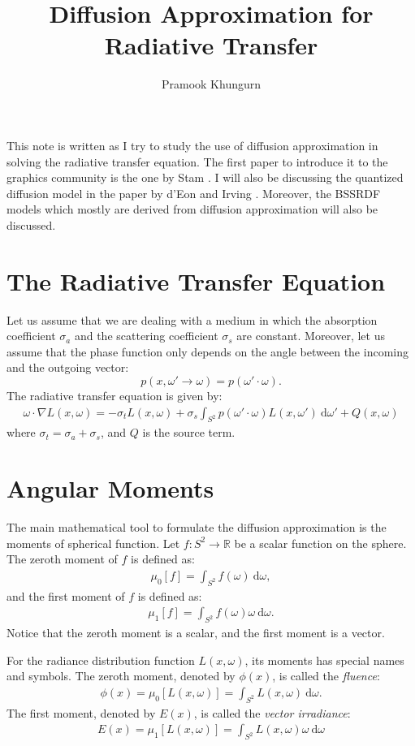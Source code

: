 \documentclass[10pt]{article}
\title{Diffusion Approximation for Radiative Transfer}
\author{Pramook Khungurn}
\newcommand{\dee}{\mathrm{d}}
\newcommand{\ra}{\rightarrow}
\newcommand{\Real}{\mathbb{R}}
\begin{document}
  \maketitle

  This note is written as I try to study the use of diffusion approximation in solving the radiative transfer equation.  The first paper to introduce it to the graphics community is the one by Stam \cite{Stam:1995}.  I will also be discussing the quantized diffusion model in the paper by d'Eon and Irving \cite{d'Eon:2011}.  Moreover, the BSSRDF models which mostly are derived from diffusion approximation \cite{Jensen:2001} will also be discussed.

  \section{The Radiative Transfer Equation}
  Let us assume that we are dealing with a medium in which the absorption coefficient $\sigma_a$ and the scattering coefficient $\sigma_s$ are constant.  Moreover, let us assume that the phase function only depends on the angle between the incoming and the outgoing vector: $$p(x, \omega' \ra \omega) = p(\omega' \cdot \omega).$$
  The radiative transfer equation is given by:
  \begin{align*}
  	\omega \cdot \nabla L(x,\omega) = -\sigma_t L(x,\omega) + \sigma_s \int_{S^2} p(\omega' \cdot \omega) L(x,\omega')\ \dee\omega' + Q(x,\omega)
  \end{align*}
  where $\sigma_t = \sigma_a + \sigma_s$, and $Q$ is the source term.

  \section{Angular Moments}

  The main mathematical tool to formulate the diffusion approximation is the moments of spherical function.  Let $f: S^2 \ra \Real$ be a scalar function on the sphere.  The zeroth moment of $f$ is defined as:
  \begin{align*}
  	\mu_0[f] = \int_{S^2} f(\omega)\ \dee\omega,
  \end{align*}
  and the first moment of $f$ is defined as:
  \begin{align*}
  	\mu_1[f] = \int_{S^2} f(\omega)\omega\ \dee\omega.
  \end{align*}
  Notice that the zeroth moment is a scalar, and the first moment is a vector.

  For the radiance distribution function $L(x,\omega)$, its moments has special names and symbols.  The zeroth moment, denoted by $\phi(x)$, is called the \emph{fluence}:
  \begin{align*}
  	\phi(x) = \mu_0[L(x,\omega)] = \int_{S^2} L(x,\omega)\ \dee\omega.
  \end{align*}
  The first moment, denoted by $E(x)$, is called the \emph{vector irradiance}:
  \begin{align*}
  	E(x) = \mu_1[L(x,\omega)] = \int_{S^2} L(x,\omega)\omega\ \dee\omega
  \end{align*}
\end{document}
